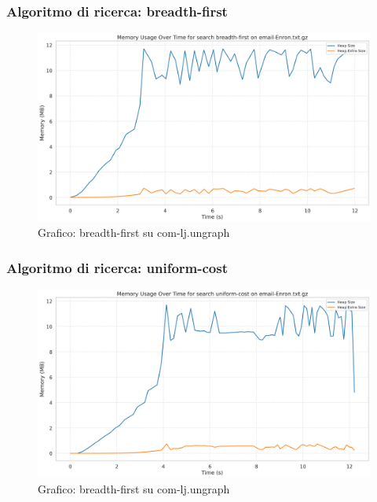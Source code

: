 \documentclass{article}
\begin{document}
\subsubsection{Algoritmo di ricerca: breadth-first}
\begin{figure}[h]\centering
\includegraphics[width=\textwidth]{../plots/email-Enron_breadth-first.png}
\caption{Grafico: breadth-first su com-lj.ungraph}
\end{figure}
\subsubsection{Algoritmo di ricerca: uniform-cost}
\begin{figure}[h]\centering
\includegraphics[width=\textwidth]{../plots/email-Enron_uniform-cost.png}
\caption{Grafico: breadth-first su com-lj.ungraph}
\end{figure}
\end{document}
